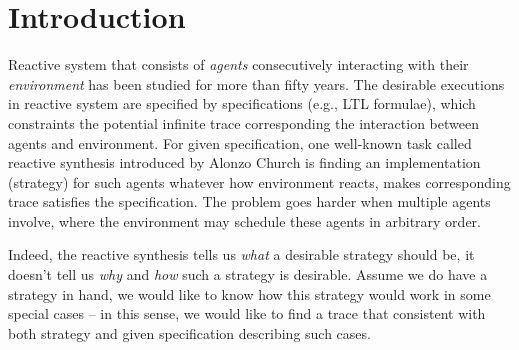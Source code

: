 \section{Introduction}

Reactive system that consists of \emph{agents} consecutively interacting with their \emph{environment} has been studied for more than fifty years. The desirable executions in reactive system are specified by specifications (e.g., LTL formulae), which constraints the potential infinite trace corresponding the interaction between agents and environment. For given specification, one well-known task called reactive synthesis\cite{ReactiveSynthesis} introduced by Alonzo Church is finding an implementation (strategy) for such agents whatever how environment reacts, makes corresponding trace satisfies the specification. The problem goes harder when multiple agents involve, where the environment may schedule these agents in arbitrary order.

Indeed, the reactive synthesis tells us \emph{what} a desirable strategy should be, it doesn't tell us \emph{why} and \emph{how} such a strategy is desirable. Assume we do have a strategy in hand, we would like to know how this strategy would work in some special cases -- in this sense, we would like to find a trace that consistent with both strategy and given specification describing such cases. 

